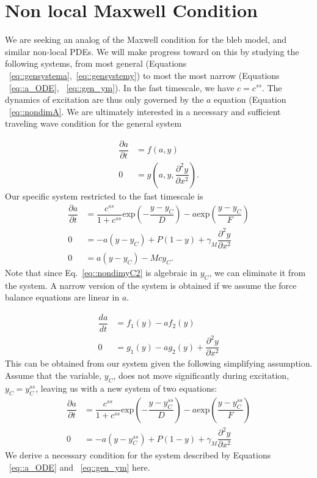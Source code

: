 \section{Non local Maxwell Condition}


We are seeking an analog of the Maxwell condition for the bleb model, and similar non-local PDEs. We will make progress toward on this by studying the following systems, from most general (Equations ~\ref{eq::gensystema},~\ref{eq::gensystemy})  to most the most narrow (Equations ~\ref{eq::a_ODE}, ~\ref{eq::gen_ym}).  In the fast timescale, we have $c = c^{ss}$.  The dynamics of excitation are thus only governed by the $a$ equation (Equation ~\ref{eq::nondimA}. We are ultimately interested in a necessary and sufficient traveling wave condition for the general system

\begin{align}
\dfrac{\partial a}{ \partial t}  & =  f(a,y)\label{eq::gensystema}\\
0 & =g \left(a,y,\dfrac{\partial^2 y}{\partial x^2}\right). \label{eq::gensystemy}
\end{align}
Our specific system restricted to the fast timescale is
\begin{align}
\dfrac{\partial a}{ \partial t}  & =  \dfrac{c^{ss}}{1+c^{ss}} \mbox{exp}\left(-\dfrac{y-y_C}{D}\right) - a \mbox{exp} \left(\dfrac{y-y_C}{F} \right)\label{eq::a_ODE}\\
0 & = -a(y - y_C) + P (1-y) + \gamma_M \dfrac{\partial^2 y}{\partial x^2}\label{eq::yM_eq} \\
0 & = a(y-y_C) - Mcy_C\label{eq::nondimyC2}.
\end{align} 
Note that since Eq.~\ref{eq::nondimyC2} is algebraic in $y_C$, we can eliminate it from the system. A narrow version of the system is obtained if we assume the force balance equations are linear in $a$.

\begin{align}
\dfrac{da}{ dt}  & = f_1(y) - a f_2(y)\label{eq::gen_a}\\
0 & = g_1(y) - ag_2(y) +  \dfrac{\partial^2 y}{\partial x^2}\label{eq::gen_ym}
\end{align}
This can be obtained from our system given the following simplifying assumption. Assume that the variable, $y_C$, does not move significantly during excitation, $y_C = y_C^{ss}$, leaving us with a new system of two equations:
\begin{align}
\dfrac{\partial a}{ \partial t}  & =  \dfrac{c^{ss}}{1+c^{ss}} \mbox{exp}\left(-\dfrac{y-y_C^{ss}}{D}\right) - a \mbox{exp} \left(\dfrac{y-y_C^{ss}}{F} \right)\label{eq::a_ODE}\\
0 & = -a(y - y_C^{ss}) + P (1-y) + \gamma_M \dfrac{\partial^2 y}{\partial x^2}\label{eq::yM_eq}
\end{align} 
We derive a necessary condition for the system described by Equations ~\ref{eq::a_ODE} and ~\ref{eq::gen_ym} here. 

